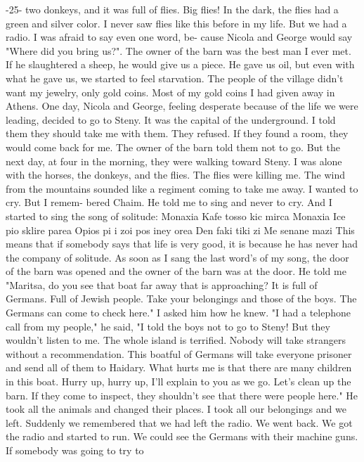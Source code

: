 -25- 
two donkeys, and it was full of flies. Big flies! In the dark, the 
flies had a green and silver color. I never saw flies like this before 
in my life. But we had a radio. I was afraid to say even one word, be-
cause Nicola and George would say "Where did you bring us?". The owner 
of the barn was the best man I ever met. If he slaughtered a sheep, he 
 would give us a piece. He gave us oil, but even with what he gave us, 
we started to feel starvation. The people of the village didn’t want 
my jewelry, only gold coins. Most of my gold coins I had given away 
in Athens. 
One day, Nicola and George, feeling desperate because of the life 
we were leading, decided to go to Steny. It was the capital of the 
underground. I told them they should take me with them. They refused. 
If they found a room, they would come back for me. The owner of the barn 
told them not to go. But the next day, at four in the morning, they were 
walking toward Steny. I was alone with the horses, the donkeys, and the 
flies. The flies were killing me. The wind from the mountains sounded 
like a regiment coming to take me away. I wanted to cry. But I remem-
bered Chaim. He told me to sing and never to cry. And I started to 
sing the song of solitude: 
Monaxia 
Kafe tosso kic mirca 
Monaxia 
Ice pio sklire parea 
Opios pi i zoi pos iney orea 
Den faki tiki zi 
Me senane mazi 
This means that if somebody says that life is very good, it 
is because he has never had the company of solitude. As soon as I sang 
the last word's of my song, the door of the barn was opened and the 
owner of the barn was at the door. 
He told me "Maritsa, do you see that boat far away that is 
approaching? It is full of Germans. Full of Jewish people. Take your 
belongings and those of the boys. The Germans can come to check here." 
I asked him how he knew. "I had a telephone call from my people," he 
said, "I told the boys not to go to Steny! But they wouldn't listen 
to me. The whole island is terrified. Nobody will take strangers without a recommendation. This boatful of Germans will take everyone prisoner and send all of them to Haidary. What hurts me is that there are many children in this boat. Hurry up, hurry up, I'll explain to 
you as we go. Let's clean up the barn. If they come to inspect, they 
shouldn’t see that there were people here." 
He took all the animals and changed their places. I took all our 
belongings and we left. Suddenly we remembered that we had left the 
radio. We went back. We got the radio and started to run. We could see 
the Germans with their machine guns. If somebody was going to try to 
